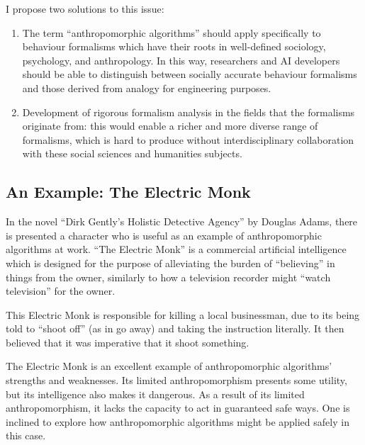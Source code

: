 I propose two solutions to this issue:

\begin{enumerate}
  \item The term ``anthropomorphic algorithms'' should apply specifically to behaviour formalisms which have their roots in well-defined sociology, psychology, and anthropology. In this way, researchers and AI developers should be able to distinguish between socially accurate behaviour formalisms and those derived from analogy for engineering purposes.
  \item Development of rigorous formalism analysis in the fields that the formalisms originate from: this would enable a richer and more diverse range of formalisms, which is hard to produce without interdisciplinary collaboration with these social sciences and humanities subjects.
\end{enumerate}


\subsection{An Example: The Electric Monk}
In the novel ``Dirk Gently's Holistic Detective Agency'' by Douglas Adams, there is presented a character who is useful as an example of anthropomorphic algorithms at work. ``The Electric Monk'' is a commercial artificial intelligence which is designed for the purpose of alleviating the burden of ``believing'' in things from the owner, similarly to how a television recorder might ``watch television'' for the owner.\par

This Electric Monk is responsible for killing a local businessman, due to its being told to ``shoot off'' (as in go away) and taking the instruction literally. It then believed that it was imperative that it shoot something.\par

The Electric Monk is an excellent example of anthropomorphic algorithms' strengths and weaknesses. Its limited anthropomorphism presents some utility, but its intelligence also makes it dangerous. As a result of its limited anthropomorphism, it lacks the capacity to act in guaranteed safe ways. One is inclined to explore how anthropomorphic algorithms might be applied safely in this case.\par

